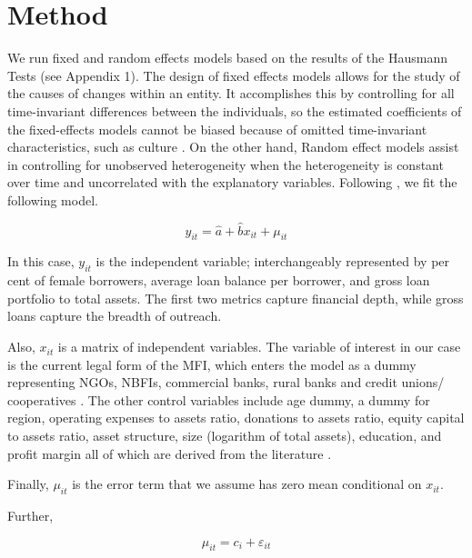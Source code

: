 \documentclass[a4paper, nobind]{templates/ociamthesis}
\begin{document}
\hypertarget{method-1}{%
\section{Method}\label{method-1}}

We run fixed and random effects models based on the results of the Hausmann Tests (see Appendix 1). The design of fixed effects models allows for the study of the causes of changes within an entity. It accomplishes this by controlling for all time-invariant differences between the individuals, so the estimated coefficients of the fixed-effects models cannot be biased because of omitted time-invariant characteristics, such as culture \autocite{torres2007panel}. On the other hand, Random effect models assist in controlling for unobserved heterogeneity when the heterogeneity is constant over time and uncorrelated with the explanatory variables. Following \textcite{roberts2013endogeneity}, we fit the following model.

\begin{equation}
y_{it} = \hat{a} + \hat{b}x_{it} + \mu_{it}
\end{equation}

In this case, \(y_{it}\) is the independent variable; interchangeably represented by per cent of female borrowers, average loan balance per borrower, and gross loan portfolio to total assets. The first two metrics capture financial depth, while gross loans capture the breadth of outreach.

Also, \(x_{it}\) is a matrix of independent variables. The variable of interest in our case is the current legal form of the MFI, which enters the model as a dummy representing NGOs, NBFIs, commercial banks, rural banks and credit unions/ cooperatives \autocite{ayyagari2013financing}. The other control variables include age dummy, a dummy for region, operating expenses to assets ratio, donations to assets ratio, equity capital to assets ratio, asset structure, size (logarithm of total assets), education, and profit margin all of which are derived from the literature \autocite{ayyagari2013financing,d2017ngos,d2013unsubsidized}.

Finally, \(\mu_{it}\) is the error term that we assume has zero mean conditional on \(x_{it}\).

Further,

\begin{equation}
\mu_{it} = c_{i} + \varepsilon_{it}
\end{equation}
\end{document}

